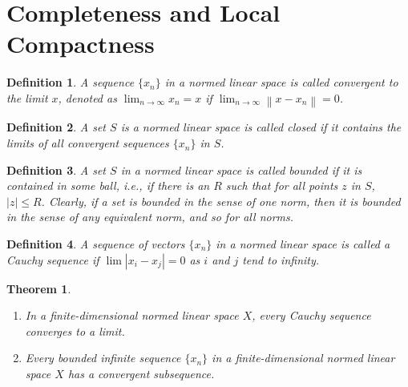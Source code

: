 \documentclass[11pt]{book}
\newtheorem{definition}{Definition}[chapter]
\newtheorem{theorem}{Theorem}[chapter]
\theoremstyle{definition}
\numberwithin{equation}{chapter}
\begin{document}
\medskip

\section{Completeness and Local Compactness}

\begin{definition}
A sequence $\{x_n\}$ in a normed linear space is called convergent to the limit $x$, denoted as $\lim_{n \to \infty} x_n = x$ if $\lim_{n \to \infty} \left\|x - x_n\right\| = 0$.
\end{definition}

\medskip

\begin{definition}
A set $S$ is a normed linear space is called closed if it contains the limits of all convergent sequences $\{x_n\}$ in $S$.
\end{definition}

\medskip

\begin{definition}
A set $S$ in a normed linear space is called bounded if it is contained in some ball, i.e., if there is an $R$ such that for all points $z$ in $S$, $\left|z\right| \leq R$. Clearly, if a set is bounded in the sense of one norm, then it is bounded in the sense of any equivalent norm, and so for all norms.
\end{definition}

\medskip

\begin{definition}
A sequence of vectors $\{x_n\}$ in a normed linear space is called a Cauchy sequence if $\lim \left|x_i - x_j\right| = 0$ as $i$ and $j$ tend to infinity.
\end{definition}

\medskip

\begin{theorem}\label{complete_compact_theorem}
~\begin{enumerate}[label=(\alph*)]
    \item In a finite-dimensional normed linear space $X$, every Cauchy sequence converges to a limit.
    
    \item Every bounded infinite sequence $\{x_n\}$ in a finite-dimensional normed linear space $X$ has a convergent subsequence.
\end{enumerate}
\end{theorem}

\medskip
\end{document}
